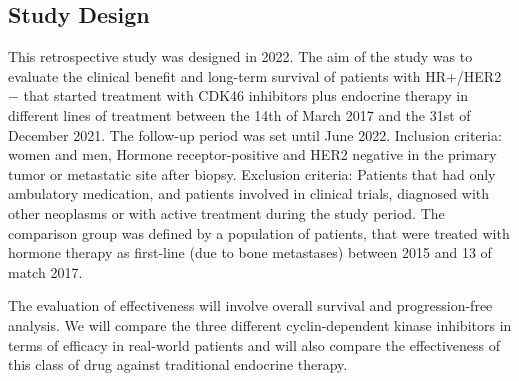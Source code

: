 

\subsection{Study Design}


This retrospective study was designed in 2022. The aim of the study was to evaluate the clinical benefit and long-term survival of patients with HR+/HER2$-$ that started treatment with CDK4\/6 inhibitors plus endocrine therapy in different lines of treatment between the 14th of March 2017 and the 31st of December 2021. The follow-up period was set until June 2022. 
Inclusion criteria:  women and men, Hormone receptor-positive and HER2 negative in the primary tumor or metastatic site after biopsy.
Exclusion criteria: Patients that had only ambulatory medication, and patients involved in clinical trials, diagnosed with other neoplasms or with active treatment during the study period.
The comparison group was defined by a population of patients, that were treated with hormone therapy as first-line (due to bone metastases) between 2015 and 13 of match 2017.

The evaluation of effectiveness will involve overall survival and progression-free analysis. We will compare the three different cyclin-dependent kinase inhibitors in terms of efficacy in real-world patients and will also compare the effectiveness of this class of drug against traditional endocrine therapy. 





